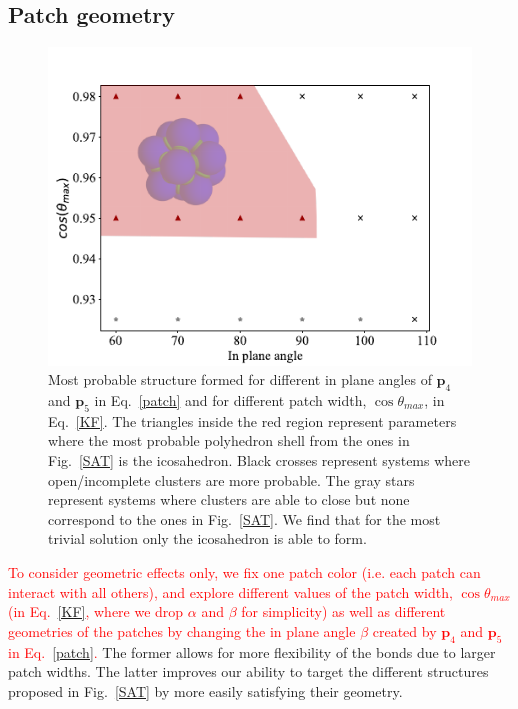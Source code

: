 \documentclass[a4paper, amsfonts, amssymb, amsmath, reprint, showkeys, nofootinbib, twoside]{revtex4-1}
\begin{document}
\subsection{Patch geometry}


\begin{figure}[t]
	\includegraphics{fig2.pdf}
	\caption{\label{N1c1} Most probable structure formed for different in plane angles of $\textbf{p}_4$ and $\textbf{p}_5$ in Eq.~\ref{patch} and for different patch width, $\cos\theta_{max}$, in Eq.~\ref{KF}. The triangles inside the red region represent parameters where the most probable polyhedron shell from the ones in Fig.~\ref{SAT} is the icosahedron. Black crosses represent systems where open/incomplete clusters are more probable. The gray stars represent systems where clusters are able to close but none correspond to the ones in Fig.~\ref{SAT}. We find that for the most trivial solution only the icosahedron is able to form.}
\end{figure}


\textcolor{red}{To consider geometric effects only, we fix one patch color (i.e. each patch can interact with all others), and explore different values of the patch width, $\cos\theta_{max}$ (in Eq.~\ref{KF}, where we drop $\alpha$ and $\beta$ for simplicity) as well as different geometries of the patches by changing the in plane angle $\beta$ created by $\textbf{p}_4$ and $\textbf{p}_5$ in Eq.~\ref{patch}.} The former allows for more flexibility of the bonds due to larger patch widths. The latter improves our ability to target the different structures proposed in Fig.~\ref{SAT} by more easily satisfying their geometry.
\end{document}
